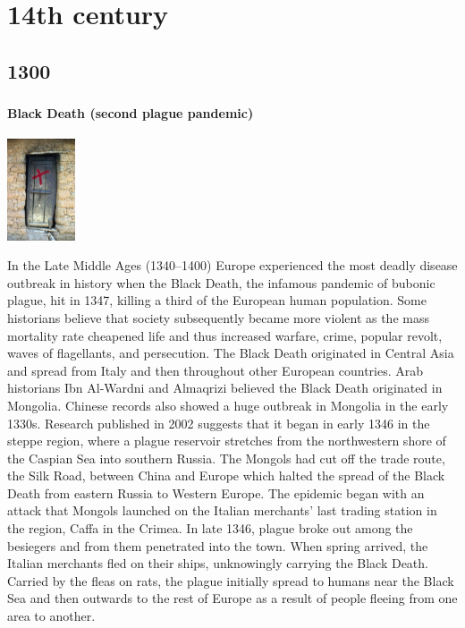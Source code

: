 \documentclass[11pt]{report}
\begin{document}
\part{14th century}
\chapter{1300}
\section{}
\subsection{Black Death (second plague pandemic)}
\vspace{2mm}\begin{center}\includegraphics[width=2cm]{./img/bubonicDoor.jpg}\end{center}
In the Late Middle Ages (1340–1400) Europe experienced the most deadly disease outbreak in history when the Black Death, the infamous pandemic of bubonic plague, hit in 1347, killing a third of the European human population. Some historians believe that society subsequently became more violent as the mass mortality rate cheapened life and thus increased warfare, crime, popular revolt, waves of flagellants, and persecution. The Black Death originated in Central Asia and spread from Italy and then throughout other European countries. Arab historians Ibn Al-Wardni and Almaqrizi believed the Black Death originated in Mongolia. Chinese records also showed a huge outbreak in Mongolia in the early 1330s. Research published in 2002 suggests that it began in early 1346 in the steppe region, where a plague reservoir stretches from the northwestern shore of the Caspian Sea into southern Russia. The Mongols had cut off the trade route, the Silk Road, between China and Europe which halted the spread of the Black Death from eastern Russia to Western Europe. The epidemic began with an attack that Mongols launched on the Italian merchants' last trading station in the region, Caffa in the Crimea. In late 1346, plague broke out among the besiegers and from them penetrated into the town. When spring arrived, the Italian merchants fled on their ships, unknowingly carrying the Black Death. Carried by the fleas on rats, the plague initially spread to humans near the Black Sea and then outwards to the rest of Europe as a result of people fleeing from one area to another.
\end{document}
